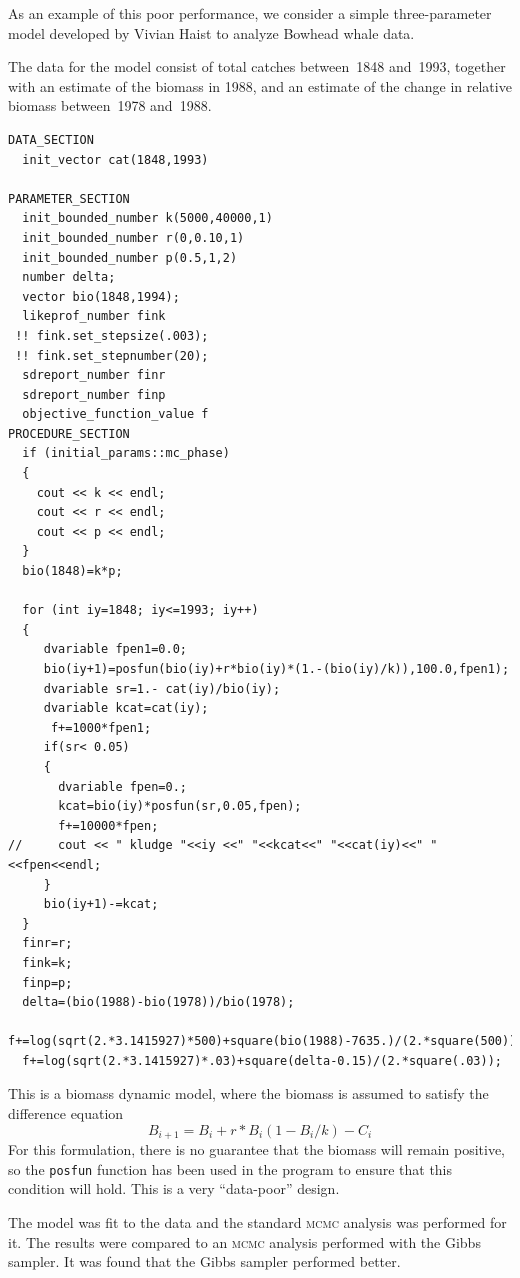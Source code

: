 \documentclass{admbmanual}
\begin{document}
As an example of this poor performance, we consider a simple three-parameter 
model developed by Vivian Haist to analyze Bowhead whale
data.

The data for the model consist of total catches between~1848 and~1993,
together with an estimate of the biomass in 1988, and an estimate of the
change in relative biomass between~1978 and~1988.
 
\begin{lstlisting}
DATA_SECTION
  init_vector cat(1848,1993)

PARAMETER_SECTION
  init_bounded_number k(5000,40000,1)
  init_bounded_number r(0,0.10,1)
  init_bounded_number p(0.5,1,2)
  number delta;
  vector bio(1848,1994);
  likeprof_number fink
 !! fink.set_stepsize(.003);
 !! fink.set_stepnumber(20);
  sdreport_number finr
  sdreport_number finp
  objective_function_value f
PROCEDURE_SECTION
  if (initial_params::mc_phase)
  {
    cout << k << endl;
    cout << r << endl;
    cout << p << endl;
  }
  bio(1848)=k*p;
 
  for (int iy=1848; iy<=1993; iy++)
  {
     dvariable fpen1=0.0;
     bio(iy+1)=posfun(bio(iy)+r*bio(iy)*(1.-(bio(iy)/k)),100.0,fpen1); 
     dvariable sr=1.- cat(iy)/bio(iy);
     dvariable kcat=cat(iy);
      f+=1000*fpen1;
     if(sr< 0.05)
     {
       dvariable fpen=0.;
       kcat=bio(iy)*posfun(sr,0.05,fpen);
       f+=10000*fpen;
//     cout << " kludge "<<iy <<" "<<kcat<<" "<<cat(iy)<<" "<<fpen<<endl;
     }
     bio(iy+1)-=kcat;
  }
  finr=r;
  fink=k;
  finp=p;
  delta=(bio(1988)-bio(1978))/bio(1978);
  f+=log(sqrt(2.*3.1415927)*500)+square(bio(1988)-7635.)/(2.*square(500));
  f+=log(sqrt(2.*3.1415927)*.03)+square(delta-0.15)/(2.*square(.03));
\end{lstlisting}
This is a biomass dynamic model, where the biomass is assumed to
satisfy the difference equation
\begin{equation}
  B_{i+1}=B_i+r*B_i(1-B_i/k)-C_i 
\end{equation}
For this formulation, there is no guarantee that the biomass will
remain positive, so the \texttt{posfun} function has been used in 
the program to ensure that this condition will hold.
This is a very ``data-poor'' design. 

The model was fit to the data and the standard \textsc{mcmc} analysis was performed
for it. The results were compared to an \textsc{mcmc} analysis performed with
the Gibbs sampler. It was found that the Gibbs sampler performed better.
\end{document}
